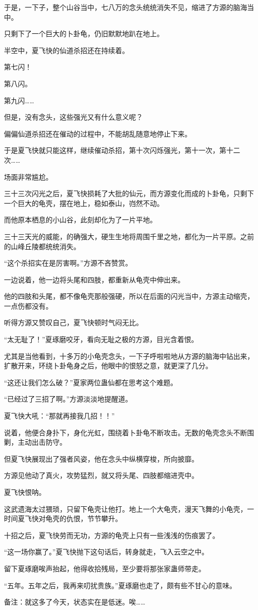 \begin{this_body}
于是，一下子，整个山谷当中，七八万的念头统统消失不见，缩进了方源的脑海当中。

只剩下了一个巨大的卜卦龟，仍旧默默地趴在地上。

半空中，夏飞快的仙道杀招还在持续着。

第七闪！

第八闪。

第九闪……

但是，没有念头，这些强光又有什么意义呢？

偏偏仙道杀招还在催动的过程中，不能胡乱随意地停止下来。

于是夏飞快就只能这样，继续催动杀招，第十次闪烁强光，第十一次，第十二次……

场面非常尴尬。

三十三次闪光之后，夏飞快损耗了大批的仙元，而方源变化而成的卜卦龟，只剩下一个巨大的龟壳，摆在地上，稳如泰山，岿然不动。

而他原本栖息的小山谷，此刻却化为了一片平地。

三十三天光的威能，的确强大，硬生生地将周围千里之地，都化为一片平原。之前的山峰丘陵都统统消失。

“这个杀招实在是厉害啊。”方源不吝赞赏。

一边说着，他一边将头尾和四肢，都重新从龟壳中伸出来。

他的四肢和头尾，都不像龟壳那般强硬，所以在后面的闪光当中，方源主动缩壳，一点伤都没有。

听得方源又赞叹自己，夏飞快顿时气闷无比。

“太无耻了！”夏琢磨咬牙，看向无耻之极的方源，目光含着恨。

尤其是当他看到，十多万的小龟壳念头，一下子呼啦啦地从方源的脑海中钻出来，扩散开来，环绕卜卦龟身之后，他眼中的恨怒之意，就更深了几分。

“这还让我们怎么破？”夏家两位蛊仙都在思考这个难题。

“已经过了三招了啊。”方源淡淡地提醒道。

夏飞快大吼：“那就再接我几招！！”

说着，他便合身扑下，身化光虹，围绕着卜卦龟不断攻击。无数的龟壳念头不断围剿，主动出击防守。

但夏飞快展现出了强者风姿，他在念头中纵横穿梭，所向披靡。

方源见他动了真火，攻势猛烈，就又将头尾、四肢都缩进壳中。

夏飞快恨呐。

这武遗海太过猥琐，只留下龟壳让他打。地上一个大龟壳，漫天飞舞的小龟壳，一时间夏飞快对龟壳的仇恨，节节攀升。

十招之后，夏飞快劳而无功，方源的龟壳上只有一些浅浅的伤痕罢了。

“这一场你赢了。”夏飞快抛下这句话后，转身就走，飞入云空之中。

留下夏琢磨唉声抬起，他得收拾残局，至少要将那张家蛊师带走。

“五年。五年之后，我再来叨扰贵族。”夏琢磨也走了，颇有些不甘心的意味。

备注：就这多了今天，状态实在是低迷。唉……

\end{this_body}

